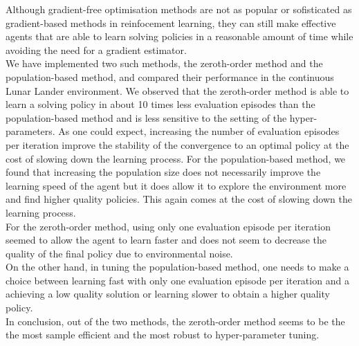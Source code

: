 \documentclass[10pt]{article}
\begin{document}
Although gradient-free optimisation methods are not as popular or sofisticated as gradient-based methods in reinfocement learning, they can still make effective agents that are able to learn solving policies in a reasonable amount of time while avoiding the need for a gradient estimator.\\
We have implemented two such methods, the zeroth-order method and the population-based method, and compared their performance in the continuous Lunar Lander environment.
We observed that the zeroth-order method is able to learn a solving policy in about 10 times less evaluation episodes than the population-based method and is less sensitive to the setting of the hyper-parameters.
As one could expect, increasing the number of evaluation episodes per iteration improve the stability of the convergence to an optimal policy at the cost of slowing down the learning process.
For the population-based method, we found that increasing the population size does not necessarily improve the learning speed of the agent but it does allow it to explore the environment more and find higher quality policies. This again comes at the cost of slowing down the learning process.\\
For the zeroth-order method, using only one evaluation episode per iteration seemed to allow the agent to learn faster and does not seem to decrease the quality of the final policy due to environmental noise.\\
On the other hand, in tuning the population-based method, one needs to make a choice between learning
fast with only one evaluation episode per iteration and a achieving a low quality solution or learning slower to obtain a higher quality policy.\\
In conclusion, out of the two methods, the zeroth-order method seems to be the the most sample efficient and the most robust to hyper-parameter tuning.



\end{document}

